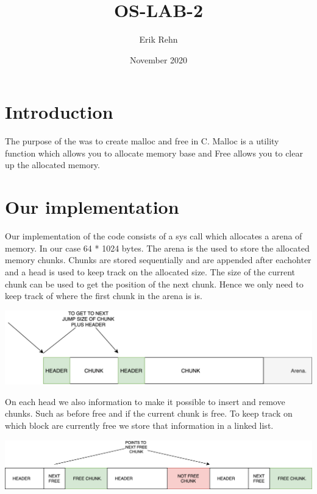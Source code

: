 \documentclass{article}
\title{OS-LAB-2}
\author{Erik Rehn}
\date{November 2020}
\begin{document}
\maketitle

\section{Introduction}

The purpose of the was to create malloc and free in C. Malloc is a utility function which allows you to allocate memory base and Free allows you to clear up the allocated memory.


\section{Our implementation}
Our implementation of the code consists of a sys call which allocates a arena of memory. In our case 64 * 1024 bytes. The arena is the used to store the allocated memory chunks. Chunks are stored sequentially and are appended after eachohter and a head is used to keep track on the allocated size. The size of the current chunk can be used to get the position of the next chunk. Hence we only need to keep track of where the first chunk in the arena is is.\newline

\begin{center}
    \includegraphics[scale=0.12]{images/arena-rep.png}
\end{center}

On each head we also information to make it possible to insert and remove chunks. Such as before free and if the current chunk is free. To keep track on which block are currently free we store that information in a linked list.\newline

\begin{center}
\includegraphics[scale=0.09]{images/linked-list.png}
\end{center}
\end{document}
